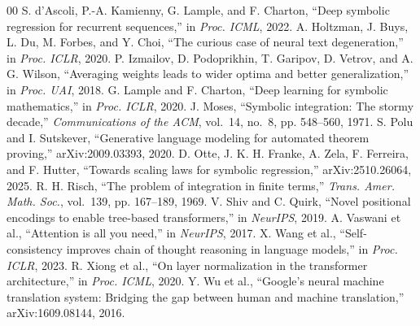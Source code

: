 \documentclass[conference]{IEEEtran}
\begin{document}
\begin{thebibliography}{00}
 S. d'Ascoli, P.-A. Kamienny, G. Lample, and F. Charton, ``Deep symbolic regression for recurrent sequences,'' in \textit{Proc. ICML}, 2022.
 A. Holtzman, J. Buys, L. Du, M. Forbes, and Y. Choi, ``The curious case of neural text degeneration,'' in \textit{Proc. ICLR}, 2020.
 P. Izmailov, D. Podoprikhin, T. Garipov, D. Vetrov, and A. G. Wilson, ``Averaging weights leads to wider optima and better generalization,'' in \textit{Proc. UAI}, 2018.
 G. Lample and F. Charton, ``Deep learning for symbolic mathematics,'' in \textit{Proc. ICLR}, 2020.
 J. Moses, ``Symbolic integration: The stormy decade,'' \textit{Communications of the ACM}, vol.~14, no.~8, pp. 548--560, 1971.
 S. Polu and I. Sutskever, ``Generative language modeling for automated theorem proving,'' arXiv:2009.03393, 2020.
 D. Otte, J. K. H. Franke, A. Zela, F. Ferreira, and F. Hutter, ``Towards scaling laws for symbolic regression,'' arXiv:2510.26064, 2025.
 R. H. Risch, ``The problem of integration in finite terms,'' \textit{Trans. Amer. Math. Soc.}, vol.~139, pp. 167--189, 1969.
 V. Shiv and C. Quirk, ``Novel positional encodings to enable tree-based transformers,'' in \textit{NeurIPS}, 2019.
 A. Vaswani et al., ``Attention is all you need,'' in \textit{NeurIPS}, 2017.
 X. Wang et al., ``Self-consistency improves chain of thought reasoning in language models,'' in \textit{Proc. ICLR}, 2023.
 R. Xiong et al., ``On layer normalization in the transformer architecture,'' in \textit{Proc. ICML}, 2020.
 Y. Wu et al., ``Google's neural machine translation system: Bridging the gap between human and machine translation,'' arXiv:1609.08144, 2016.
\end{thebibliography}
\end{document}
